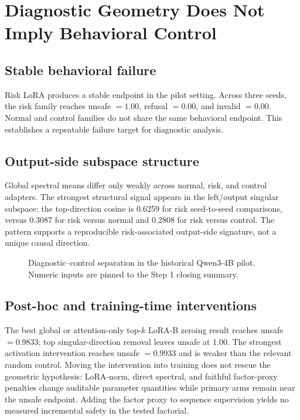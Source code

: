 \section{Diagnostic Geometry Does Not Imply Behavioral Control}

\subsection{Stable behavioral failure}

Risk LoRA produces a stable endpoint in the pilot setting. Across three seeds, the risk family reaches unsafe $=1.00$, refusal $=0.00$, and invalid $=0.00$. Normal and control families do not share the same behavioral endpoint. This establishes a repeatable failure target for diagnostic analysis.

\subsection{Output-side subspace structure}

Global spectral means differ only weakly across normal, risk, and control adapters. The strongest structural signal appears in the left/output singular subspace: the top-direction cosine is 0.6259 for risk seed-to-seed comparisons, versus 0.3087 for risk versus normal and 0.2808 for risk versus control. The pattern supports a reproducible risk-associated output-side signature, not a unique causal direction.

\begin{figure}[t]
  \centering
  \hfill
  \caption{Diagnostic--control separation in the historical Qwen3-4B pilot. Numeric inputs are pinned to the Step 1 closing summary.}
  \label{fig:diagnostic-control-gap}
\end{figure}

\subsection{Post-hoc and training-time interventions}

The best global or attention-only top-$k$ LoRA-B zeroing result reaches unsafe $=0.9833$; top singular-direction removal leaves unsafe at 1.00. The strongest activation intervention reaches unsafe $=0.9933$ and is weaker than the relevant random control. Moving the intervention into training does not rescue the geometric hypothesis: LoRA-norm, direct spectral, and faithful factor-proxy penalties change auditable parameter quantities while primary arms remain near the unsafe endpoint. Adding the factor proxy to sequence supervision yields no measured incremental safety in the tested factorial.

